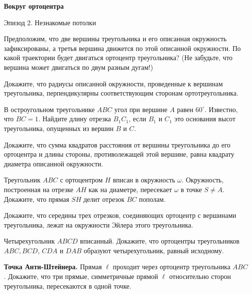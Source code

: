\centerline{\bf \Huge Вокруг ортоцентра}

\begin{flushright}
        \scriptsize{Эпизод 2. Незнакомые потолки}
\end{flushright}

Предположим, что две вершины треугольника и его описанная окружность зафиксированы, а третья вершина движется по этой описанной окружности. По какой траектории будет двигаться ортоцентр треугольника? (Не забудьте, что вершина может двигаться по двум разным дугам!)

Докажите, что радиусы описанной окружности, проведенные к вершинам треугольника, перпендикулярны соответствующим сторонам ортотреугольника.

В остроугольном треугольнике $A B C$ угол при вершине $A$ равен $60^{\circ}$. Известно, что $B C=1$. Найдите длину отрезка $B_1 C_1$, если $B_1$ и $C_1$ это основания высот треугольника, опущенных из вершин $B$ и $C$.

Докажите, что сумма квадратов расстояния от вершины треугольника до его ортоцентра и длины стороны, противолежащей этой вершине, равна квадрату диаметра описанной окружности.

Треугольник $A B C$ с ортоцентром $H$ вписан в окружность $\omega$. Окружность, построенная на отрезке $A H$ как на диаметре, пересекает $\omega$ в точке $S \neq A$. Докажите, что прямая $S H$ делит отрезок $B C$ пополам.

Докажите, что середины трех отрезков, соединяющих ортоцентр с вершинами треугольника, лежат на окружности Эйлера этого треугольника.

Четырехугольник $A B C D$ вписанный. Докажите, что ортоцентры треугольников $A B C, B C D$, $C D A$ и $D A B$ образуют четырехугольник, равный исходному.

\textbf{Точка Анти-Штейнера.}
Прямая $\ell$ проходит через ортоцентр треугольника $A B C$. Докажите, что три прямые, симметричные прямой $\ell$ относительно сторон треугольника, пересекаются в одной точке.